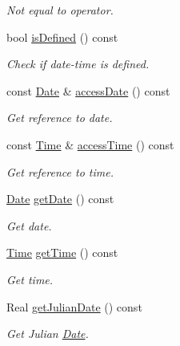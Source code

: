 \begin{DoxyCompactItemize}
\begin{DoxyCompactList}\small\item\em Not equal to operator. \end{DoxyCompactList}\item 
bool \hyperlink{classostk_1_1physics_1_1time_1_1_date_time_a2fd2deab390516483e1757c45ae81282}{is\+Defined} () const
\begin{DoxyCompactList}\small\item\em Check if date-\/time is defined. \end{DoxyCompactList}\item 
const \hyperlink{classostk_1_1physics_1_1time_1_1_date}{Date} \& \hyperlink{classostk_1_1physics_1_1time_1_1_date_time_a27b1ada0ea5f28fe6dcd131cdd4e2a5c}{access\+Date} () const
\begin{DoxyCompactList}\small\item\em Get reference to date. \end{DoxyCompactList}\item 
const \hyperlink{classostk_1_1physics_1_1time_1_1_time}{Time} \& \hyperlink{classostk_1_1physics_1_1time_1_1_date_time_a263c05ca06cee6b535e3da6783184bee}{access\+Time} () const
\begin{DoxyCompactList}\small\item\em Get reference to time. \end{DoxyCompactList}\item 
\hyperlink{classostk_1_1physics_1_1time_1_1_date}{Date} \hyperlink{classostk_1_1physics_1_1time_1_1_date_time_aafd979e2eb7095ee7bc8bb3e9a1b52ae}{get\+Date} () const
\begin{DoxyCompactList}\small\item\em Get date. \end{DoxyCompactList}\item 
\hyperlink{classostk_1_1physics_1_1time_1_1_time}{Time} \hyperlink{classostk_1_1physics_1_1time_1_1_date_time_ae1460f38a9e41c5c7e42874de571d9f9}{get\+Time} () const
\begin{DoxyCompactList}\small\item\em Get time. \end{DoxyCompactList}\item 
Real \hyperlink{classostk_1_1physics_1_1time_1_1_date_time_a067835c455394e18072d654455ac89cb}{get\+Julian\+Date} () const
\begin{DoxyCompactList}\small\item\em Get Julian \hyperlink{classostk_1_1physics_1_1time_1_1_date}{Date}. \end{DoxyCompactList}\item 

\end{DoxyCompactItemize}
